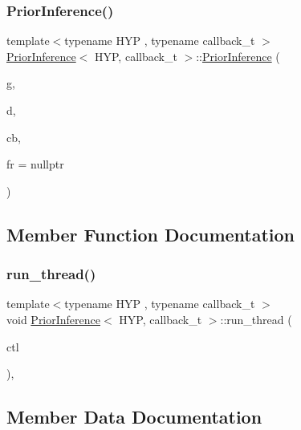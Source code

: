 \subsubsection{\texorpdfstring{Prior\+Inference()}{PriorInference()}}
{\footnotesize\ttfamily template$<$typename H\+YP , typename callback\+\_\+t $>$ \\
\hyperlink{class_prior_inference}{Prior\+Inference}$<$ H\+YP, callback\+\_\+t $>$\+::\hyperlink{class_prior_inference}{Prior\+Inference} (\begin{DoxyParamCaption}\item[{typename H\+Y\+P\+::\+Grammar\+\_\+t $\ast$}]{g,  }\item[{typename H\+Y\+P\+::data\+\_\+t $\ast$}]{d,  }\item[{callback\+\_\+t \&}]{cb,  }\item[{H\+YP $\ast$}]{fr = {\ttfamily nullptr} }\end{DoxyParamCaption})\hspace{0.3cm}{\ttfamily [inline]}}



\subsection{Member Function Documentation}
\mbox{\label{class_prior_inference_a1c641618dffc7d3182ffdb2451500c01}} 
\subsubsection{\texorpdfstring{run\+\_\+thread()}{run\_thread()}}
{\footnotesize\ttfamily template$<$typename H\+YP , typename callback\+\_\+t $>$ \\
void \hyperlink{class_prior_inference}{Prior\+Inference}$<$ H\+YP, callback\+\_\+t $>$\+::run\+\_\+thread (\begin{DoxyParamCaption}\item[{\hyperlink{struct_control}{Control}}]{ctl }\end{DoxyParamCaption})\hspace{0.3cm}{\ttfamily [inline]}, {\ttfamily [override]}}



\subsection{Member Data Documentation}
\mbox{\label{class_prior_inference_a0b71e0bf3b2c27fa97be006a3c3738a0}} 
